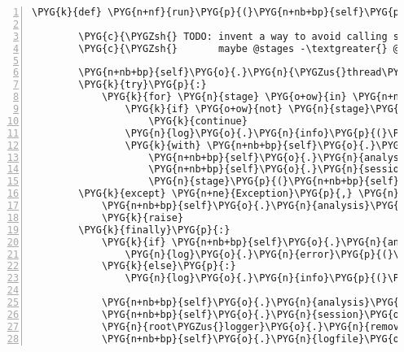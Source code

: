 \begin{Verbatim}[commandchars=\\\{\},numbers=left,firstnumber=1,stepnumber=5]
    \PYG{k}{def} \PYG{n+nf}{run}\PYG{p}{(}\PYG{n+nb+bp}{self}\PYG{p}{)}\PYG{p}{:}

        \PYG{c}{\PYGZsh{} TODO: invent a way to avoid calling stages that won't do anything}
        \PYG{c}{\PYGZsh{}       maybe @stages -\textgreater{} @stages(condition) something ...}

        \PYG{n+nb+bp}{self}\PYG{o}{.}\PYG{n}{\PYGZus{}thread\PYGZus{}init}\PYG{p}{(}\PYG{p}{)}
        \PYG{k}{try}\PYG{p}{:}
            \PYG{k}{for} \PYG{n}{stage} \PYG{o+ow}{in} \PYG{n+nb+bp}{self}\PYG{o}{.}\PYG{n}{stages}\PYG{p}{:}
                \PYG{k}{if} \PYG{o+ow}{not} \PYG{n}{stage}\PYG{o}{.}\PYG{n}{should\PYGZus{}run}\PYG{p}{(}\PYG{n+nb+bp}{self}\PYG{p}{)}\PYG{p}{:}
                    \PYG{k}{continue}
                \PYG{n}{log}\PYG{o}{.}\PYG{n}{info}\PYG{p}{(}\PYG{l+s}{"}\PYG{l+s}{=== }\PYG{l+s+si}{\PYGZpc{}s}\PYG{l+s}{ ===}\PYG{l+s}{"} \PYG{o}{\PYGZpc{}} \PYG{n}{stage}\PYG{o}{.}\PYG{n}{func\PYGZus{}name}\PYG{p}{)}
                \PYG{k}{with} \PYG{n+nb+bp}{self}\PYG{o}{.}\PYG{n}{\PYGZus{}stage\PYGZus{}log\PYGZus{}manager}\PYG{p}{(}\PYG{n}{stage}\PYG{o}{.}\PYG{n}{func\PYGZus{}name}\PYG{p}{)}\PYG{p}{:}
                    \PYG{n+nb+bp}{self}\PYG{o}{.}\PYG{n}{analysis}\PYG{o}{.}\PYG{n}{stage} \PYG{o}{=} \PYG{n}{stage}\PYG{o}{.}\PYG{n}{func\PYGZus{}name}
                    \PYG{n+nb+bp}{self}\PYG{o}{.}\PYG{n}{session}\PYG{o}{.}\PYG{n}{commit}\PYG{p}{(}\PYG{p}{)}
                    \PYG{n}{stage}\PYG{p}{(}\PYG{n+nb+bp}{self}\PYG{p}{)}
        \PYG{k}{except} \PYG{n+ne}{Exception}\PYG{p}{,} \PYG{n}{e}\PYG{p}{:}
            \PYG{n+nb+bp}{self}\PYG{o}{.}\PYG{n}{analysis}\PYG{o}{.}\PYG{n}{error} \PYG{o}{=} \PYG{n+nb}{repr}\PYG{p}{(}\PYG{n}{e}\PYG{p}{)}
            \PYG{k}{raise}
        \PYG{k}{finally}\PYG{p}{:}
            \PYG{k}{if} \PYG{n+nb+bp}{self}\PYG{o}{.}\PYG{n}{analysis}\PYG{o}{.}\PYG{n}{error}\PYG{p}{:}
                \PYG{n}{log}\PYG{o}{.}\PYG{n}{error}\PYG{p}{(}\PYG{n+nb+bp}{self}\PYG{o}{.}\PYG{n}{analysis}\PYG{o}{.}\PYG{n}{error}\PYG{p}{)}
            \PYG{k}{else}\PYG{p}{:}
                \PYG{n}{log}\PYG{o}{.}\PYG{n}{info}\PYG{p}{(}\PYG{l+s}{"}\PYG{l+s}{analysis finished}\PYG{l+s}{"}\PYG{p}{)}

            \PYG{n+nb+bp}{self}\PYG{o}{.}\PYG{n}{analysis}\PYG{o}{.}\PYG{n}{finished} \PYG{o}{=} \PYG{n+nb+bp}{True}
            \PYG{n+nb+bp}{self}\PYG{o}{.}\PYG{n}{session}\PYG{o}{.}\PYG{n}{commit}\PYG{p}{(}\PYG{p}{)}
            \PYG{n}{root\PYGZus{}logger}\PYG{o}{.}\PYG{n}{removeHandler}\PYG{p}{(}\PYG{n+nb+bp}{self}\PYG{o}{.}\PYG{n}{log\PYGZus{}handler}\PYG{p}{)}
            \PYG{n+nb+bp}{self}\PYG{o}{.}\PYG{n}{logfile}\PYG{o}{.}\PYG{n}{close}\PYG{p}{(}\PYG{p}{)}
\end{Verbatim}


